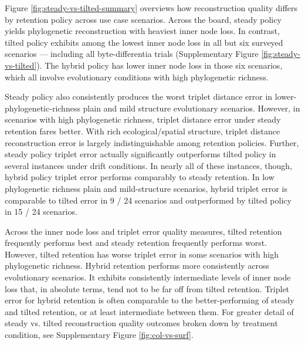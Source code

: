 Figure \ref{fig:steady-vs-tilted-summary} overviews how reconstruction quality differs by retention policy across use case scenarios.
Across the board, steady policy yields phylogenetic reconstruction with heaviest inner node loss.
In contrast, tilted policy exhibits among the lowest inner node loss in all but six surveyed scenarios --- including all byte-differentia trials (Supplementary Figure \ref{fig:steady-vs-tilted}).
The hybrid policy has lower inner node loss in those six scenarios, which all involve evolutionary conditions with high phylogenetic richness.

Steady policy also consistently produces the worst triplet distance error in lower-phylogenetic-richness plain and mild structure evolutionary scenarios.
However, in scenarios with high phylogenetic richness, triplet distance error under steady retention fares better.
With rich ecological/spatial structure, triplet distance reconstruction error is largely indistinguishable among retention policies.
Further, steady policy triplet error actually significantly outperforms tilted policy in several instances under drift conditions.
In nearly all of these instances, though, hybrid policy triplet error performs comparably to steady retention.
In low phylogenetic richness plain and mild-structure scenarios, hybrid triplet error is comparable to tilted error in 9 / 24 scenarios and outperformed by tilted policy in 15 / 24 scenarios.

Across the inner node loss and triplet error quality measures, tilted retention frequently performs best and steady retention frequently performs worst.
However, tilted retention has worse triplet error in some scenarios with high phylogenetic richness.
Hybrid retention performs more consistently across evolutionary scenarios.
It exhibits consistently intermediate levels of inner node loss that, in absolute terms, tend not to be far off from tilted retention.
Triplet error for hybrid retention is often comparable to the better-performing of steady and tilted retention, or at least intermediate between them.
For greater detail of steady vs. tilted reconstruction quality outcomes broken down by treatment condition, see Supplementary Figure \ref{fig:col-vs-surf}.



